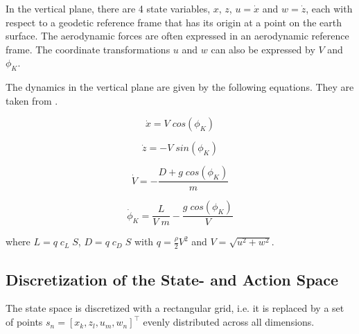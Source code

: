 In the vertical plane, there are 4 state variables, $x$, $z$, $u=\dot{x}$ and $w=\dot{z}$, each with respect to a geodetic reference frame that has its origin at a point on the earth surface. The aerodynamic forces are often expressed in an aerodynamic reference frame. The coordinate transformations $u$ and $w$ can also be expressed by $V$ and $\phi_K$.

The dynamics in the vertical plane are given by the following equations. They are taken from \cite{Fichter2009}. 

\begin{equation}
\dot{x} = V \; cos(\phi_K)
\end{equation}

\begin{equation}
\dot{z} = - V \; sin(\phi_K)
\end{equation}

\begin{equation}
\dot{V} = -\frac{D + g \; cos(\phi_K)}{m}
\end{equation}

\begin{equation}
\dot{\phi}_K = \frac{L}{V \; m} - \frac{g \; cos({\phi_K})}{V} 
\label{eq:dotgamma}
\end{equation}

where $L = q \; c_L \; S$, $D = q \; c_D \; S$ with $q = \frac{\rho}{2} V^2$ and $V=\sqrt{u^2+w^2}$.

\subsection{Discretization of the State- and Action Space}
\label{sec:disc2d}
The state space is discretized with a rectangular grid, i.e. it is replaced by a set of points $s_n=[x_k,z_l,u_m,w_n]^\top$ evenly distributed across all dimensions.

